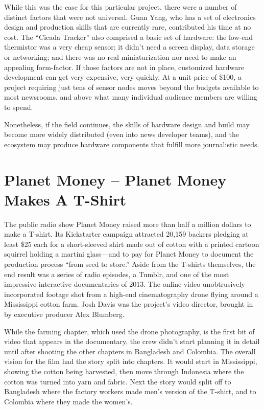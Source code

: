 \begin{itemize}
While this was the case for this particular project, there were a number
of distinct factors that were not universal. Guan Yang, who has a
set of electronics design and production skills that are currently rare,
contributed his time at no cost. The ``Cicada Tracker'' also comprised
a basic set of hardware: the low-end thermistor was a very cheap
sensor; it didn't need a screen display, data storage or networking;
and there was no real miniaturization nor need to make an appealing
form-factor. If those factors are not in place, customized hardware
development can get very expensive, very quickly. At a unit price of
\$100, a project requiring just tens of sensor nodes moves beyond the
budgets available to most newsrooms, and above what many individual
audience members are willing to spend. 

Nonetheless, if the
field continues, the skills of hardware design and build may become
more widely distributed (even into news developer teams), and the
ecosystem may produce hardware components that fulfill more
journalistic needs.
\end{itemize}

\chapter{Planet Money – Planet Money Makes A T-Shirt}
The public radio show Planet Money raised more than half a million dollars
to make a T-shirt. Its Kickstarter campaign attracted 20,159 backers
pledging at least \$25 each for a short-sleeved shirt made out of cotton with
a printed cartoon squirrel holding a martini glass—and to pay for Planet
Money to document the production process ``from seed to store.''
Aside from the T-shirts themselves, the end result was a series of radio
episodes, a Tumblr, and one of the most impressive interactive documentaries
of 2013. The online video unobtrusively incorporated footage shot
from a high-end cinematography drone flying around a Mississippi cotton
farm. Josh Davis was the project's video director, brought in by executive
producer Alex Blumberg.

While the farming chapter, which used the drone photography, is the first
bit of video that appears in the documentary, the crew didn't start planning
it in detail until after shooting the other chapters in Bangladesh and Colombia.
The overall vision for the film had the story split into chapters. It would
start in Mississippi, showing the cotton being harvested, then move through
Indonesia where the cotton was turned into yarn and fabric. Next the story
would split off to Bangladesh where the factory workers made men's version
of the T-shirt, and to Colombia where they made the women's.

